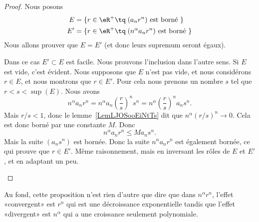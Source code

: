 \begin{proof}
	Nous posons
	\begin{subequations}
		\begin{align}
			E  & =\{ r\in \eR^+\tq\; (a_nr^n)\text{ est borné } \}            \\
			E' & =\{ r\in \eR^+\tq \; (n^{\alpha}a_nr^n)\text{ est borné } \}
		\end{align}
	\end{subequations}
	Nous allons prouver que \( E=E'\) (et donc leurs supremum seront égaux).

	\begin{subproof}
		\spitem[Si \( \alpha>0\)]

		Dans ce cas \( E'\subset E\) est facile. Nous prouvons l'inclusion dans l'autre sens. Si \( E\) est vide, c'est évident. Nous supposons que \( E\) n'est pas vide, et nous considérons \( r\in E\), et nous montrons que \( r\in E'\). Pour cela nous prenons un nombre \( s\) tel que \( r<s<\sup(E)\). Nous avons
		\begin{equation}
			n^{\alpha}a_nr^n=n^{\alpha}a_n\left( \frac{ r }{ s } \right)^ns^n=n^{\alpha}\left( \frac{ r }{ s } \right)^na_ns^n.
		\end{equation}
		Mais \( r/s<1\), donc le lemme~\ref{LemLJOSooEiNtTs} dit que \( n^{\alpha}(r/s)^n\to 0\). Cela est donc borné par une constante \( M\). Donc
		\begin{equation}
			n^{\alpha}a_nr^n\leq Ma_ns^n.
		\end{equation}
		Mais la suite \( (a_ns^n)\) est bornée. Donc la suite \( n^{\alpha}a_nr^n\) est également bornée, ce qui prouve que \( r\in E'\).
		\spitem[Si \( \alpha<0\)]
		Même raisonnement, mais en inversant les rôles de \( E\) et \( E'\), et en adaptant un peu.
	\end{subproof}
\end{proof}

\begin{remark}
	Au fond, cette proposition n'est rien d'autre que dire que dans \( n^\alpha r^n\), l'effet «convergent» est \( r^n\) qui est une décroissance exponentielle tandis que l'effet «divergent» est \( n^{\alpha}\) qui a une croissance seulement polynomiale.
\end{remark}

